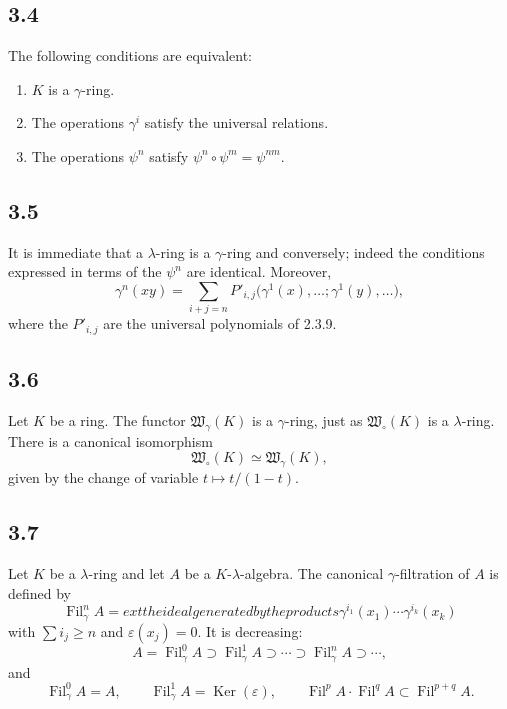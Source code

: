 \documentclass[11pt]{article}
\theoremstyle{plain}
\theoremstyle{definition}
\theoremstyle{remark}
\DeclareMathOperator{\Ker}{Ker}
\providecommand{\Fil}{\operatorname{Fil}}
\begin{document}
\subsection*{3.4}
The following conditions are equivalent:
\begin{enumerate}[label=(\roman*)]
\item $K$ is a $\gamma$-ring.
\item The operations $\gamma^i$ satisfy the universal relations.
\item The operations $\psi^n$ satisfy $\psi^n\circ\psi^m=\psi^{nm}$.
\end{enumerate}

\subsection*{3.5}
It is immediate that a $\lambda$-ring is a $\gamma$-ring and conversely; indeed the conditions expressed in terms of the $\psi^n$ are identical. Moreover,
\begin{equation}\label{eq:3.5.1}
\gamma^n(xy)=\sum_{i+j=n}P'_{i,j}\bigl(\gamma^1(x),\ldots;\gamma^1(y),\ldots\bigr),
\end{equation}
where the $P'_{i,j}$ are the universal polynomials of 2.3.9.

\subsection*{3.6}
Let $K$ be a ring. The functor $\mathfrak W_\gamma(K)$ is a $\gamma$-ring, just as $\mathfrak W_\circ(K)$ is a $\lambda$-ring. There is a canonical isomorphism
\begin{equation}\label{eq:3.6}
\mathfrak W_\circ(K)\simeq \mathfrak W_\gamma(K),
\end{equation}
given by the change of variable $t\mapsto t/(1-t)$.

\subsection*{3.7}
Let $K$ be a $\lambda$-ring and let $A$ be a $K$-$\lambda$-algebra. The canonical $\gamma$-filtration of $A$ is defined by
\begin{equation}\label{eq:3.7}
\Fil^n_\gamma A=	ext{the ideal generated by the products }\gamma^{i_1}(x_1)\cdots\gamma^{i_k}(x_k)
\end{equation}
with $\sum i_j\geq n$ and $\varepsilon(x_j)=0$. It is decreasing:
\[
A=\Fil^0_\gamma A\supset \Fil^1_\gamma A\supset\cdots\supset \Fil^n_\gamma A\supset\cdots,
\]
and
\begin{equation}\label{eq:3.7.1}
\Fil^0_\gamma A=A,
\qquad
\Fil^1_\gamma A=\Ker(\varepsilon),
\qquad
\Fil^pA\cdot\Fil^qA\subset\Fil^{p+q}A.
\end{equation}
\end{document}
